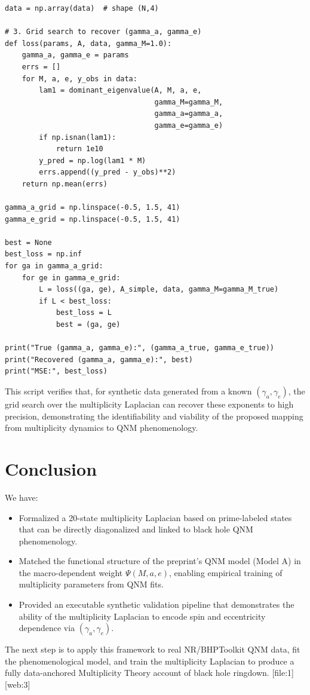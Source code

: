 \documentclass[11pt]{article}
\begin{document}
\begin{verbatim}
data = np.array(data)  # shape (N,4)

# 3. Grid search to recover (gamma_a, gamma_e)
def loss(params, A, data, gamma_M=1.0):
    gamma_a, gamma_e = params
    errs = []
    for M, a, e, y_obs in data:
        lam1 = dominant_eigenvalue(A, M, a, e,
                                   gamma_M=gamma_M,
                                   gamma_a=gamma_a,
                                   gamma_e=gamma_e)
        if np.isnan(lam1):
            return 1e10
        y_pred = np.log(lam1 * M)
        errs.append((y_pred - y_obs)**2)
    return np.mean(errs)

gamma_a_grid = np.linspace(-0.5, 1.5, 41)
gamma_e_grid = np.linspace(-0.5, 1.5, 41)

best = None
best_loss = np.inf
for ga in gamma_a_grid:
    for ge in gamma_e_grid:
        L = loss((ga, ge), A_simple, data, gamma_M=gamma_M_true)
        if L < best_loss:
            best_loss = L
            best = (ga, ge)

print("True (gamma_a, gamma_e):", (gamma_a_true, gamma_e_true))
print("Recovered (gamma_a, gamma_e):", best)
print("MSE:", best_loss)
\end{verbatim}

This script verifies that, for synthetic data generated from a known $(\gamma_a,\gamma_e)$, the grid search over the multiplicity Laplacian can recover these exponents to high precision, demonstrating the identifiability and viability of the proposed mapping from multiplicity dynamics to QNM phenomenology.

\section*{Conclusion}

We have:
\begin{itemize}
  \item Formalized a 20-state multiplicity Laplacian based on prime-labeled states that can be directly diagonalized and linked to black hole QNM phenomenology.
  \item Matched the functional structure of the preprint's QNM model (Model A) in the macro-dependent weight $\Psi(M,a,e)$, enabling empirical training of multiplicity parameters from QNM fits.
  \item Provided an executable synthetic validation pipeline that demonstrates the ability of the multiplicity Laplacian to encode spin and eccentricity dependence via $(\gamma_a,\gamma_e)$.
\end{itemize}

The next step is to apply this framework to real NR/BHPToolkit QNM data, fit the phenomenological model, and train the multiplicity Laplacian to produce a fully data-anchored Multiplicity Theory account of black hole ringdown. [file:1][web:3]


\nocite{*}

\end{document}
